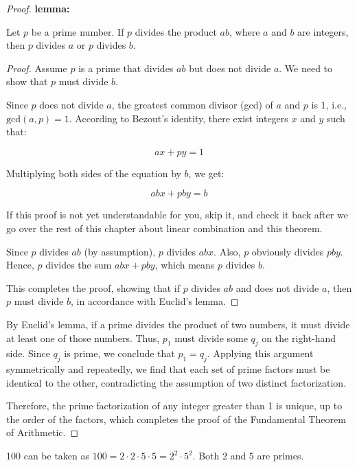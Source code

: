 \begin{proof}
            \textbf{lemma:}

                Let \(p\) be a prime number. If \(p\) divides the product \(ab\), where \(a\) and \(b\) are integers, then \(p\) divides \(a\) or \(p\) divides \(b\).
            \begin{proof}
                Assume \(p\) is a prime that divides \(ab\) but does not divide \(a\). We need to show that \(p\) must divide \(b\).

                Since \(p\) does not divide \(a\), the greatest common divisor (gcd) of \(a\) and \(p\) is 1, i.e., \(\text{gcd}(a, p) = 1\). According to Bezout's identity, there exist integers \(x\) and \(y\) such that:

                \[ax + py = 1\]

                Multiplying both sides of the equation by \(b\), we get:

                \[abx + pby = b\]
                \begin{remark}
                    If this proof is not yet understandable for you, skip it, and check it back after we go over the rest of this chapter about linear combination and this theorem.
                \end{remark}
                Since \(p\) divides \(ab\) (by assumption), \(p\) divides \(abx\). Also, \(p\) obviously divides \(pby\). Hence, \(p\) divides the sum \(abx + pby\), which means \(p\) divides \(b\).

                This completes the proof, showing that if \(p\) divides \(ab\) and does not divide \(a\), then \(p\) must divide \(b\), in accordance with Euclid's lemma.
            \end{proof}
            By Euclid's lemma, if a prime divides the product of two numbers, it must divide at least one of those numbers. Thus, $p_1$ must divide some $q_j$ on the right-hand side. Since $q_j$ is prime, we conclude that $p_1 = q_j$. Applying this argument symmetrically and repeatedly, we find that each set of prime factors must be identical to the other, contradicting the assumption of two distinct factorization.
            
            Therefore, the prime factorization of any integer greater than 1 is unique, up to the order of the factors, which completes the proof of the Fundamental Theorem of Arithmetic.
            \end{proof}
            
        \begin{example}
            100 can be taken as $100 = 2\cdot 2\cdot 5\cdot 5 = 2^2\cdot 5^2$.
            Both 2 and 5 are primes.
        \end{example}

